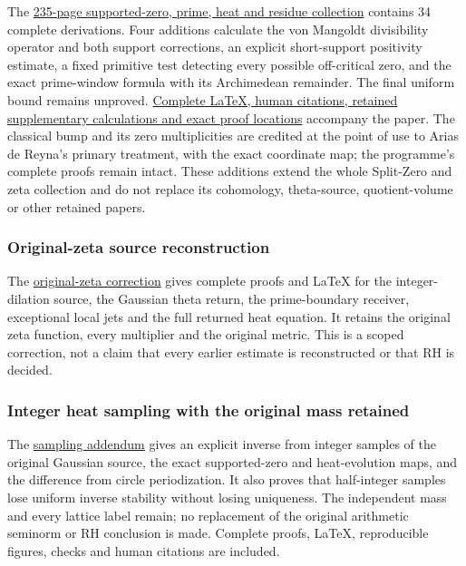 \documentclass[
]{article}
\begin{document}
The
\href{https://github.com/KokunoYumeto/zeta-function-research-reader/blob/main/workbenches/splitzero-tandem/branches/tau-zero-prime-positivity/TAU_ZERO_PRIME_POSITIVITY.pdf}{235-page
supported-zero, prime, heat and residue collection} contains 34 complete
derivations. Four additions calculate the von Mangoldt divisibility
operator and both support corrections, an explicit short-support
positivity estimate, a fixed primitive test detecting every possible
off-critical zero, and the exact prime-window formula with its
Archimedean remainder. The final uniform bound remains unproved.
\href{https://github.com/KokunoYumeto/zeta-function-research-reader/blob/main/workbenches/splitzero-tandem/branches/tau-zero-prime-positivity/PUBLICATION_COMPANION.md}{Complete
LaTeX, human citations, retained supplementary calculations and exact
proof locations} accompany the paper. The classical bump and its zero
multiplicities are credited at the point of use to Arias de Reyna's
primary treatment, with the exact coordinate map; the programme's
complete proofs remain intact. These additions extend the whole
Split-Zero and zeta collection and do not replace its cohomology,
theta-source, quotient-volume or other retained papers.

\subsubsection{Original-zeta source
reconstruction}\label{original-zeta-source-reconstruction}

The
\href{continuations/20260923-original-zeta-return/README.md}{original-zeta
correction} gives complete proofs and LaTeX for the integer-dilation
source, the Gaussian theta return, the prime-boundary receiver,
exceptional local jets and the full returned heat equation. It retains
the original zeta function, every multiplier and the original metric.
This is a scoped correction, not a claim that every earlier estimate is
reconstructed or that RH is decided.

\subsubsection{Integer heat sampling with the original mass
retained}\label{integer-heat-sampling-with-the-original-mass-retained}

The
\href{continuations/20260923-integer-heat-observation/README.md}{sampling
addendum} gives an explicit inverse from integer samples of the original
Gaussian source, the exact supported-zero and heat-evolution maps, and
the difference from circle periodization. It also proves that
half-integer samples lose uniform inverse stability without losing
uniqueness. The independent mass and every lattice label remain; no
replacement of the original arithmetic seminorm or RH conclusion is
made. Complete proofs, LaTeX, reproducible figures, checks and human
citations are included.
\end{document}

